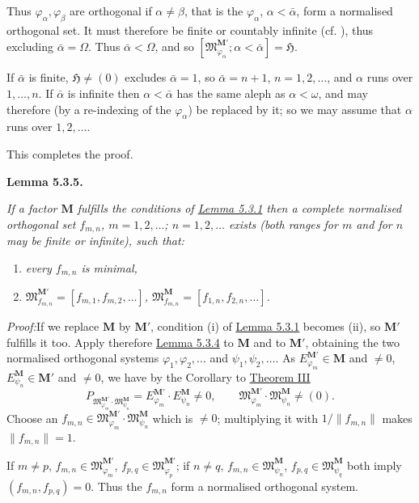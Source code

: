 \documentclass[12pt,b5paper,twoside]{article}
\newcommand{\Hspace}{\mathfrak H}
\newcommand{\M}{\mathbf M}
\newcommand{\Lemma}[1]{%
  \par\smallskip\noindent\phantomsection\label{lem:#1}\textbf{Lemma #1.}\enspace
}
\newcommand{\Proof}{\par\noindent\textit{Proof:}\enspace}
\newcommand{\lemref}[1]{\hyperref[lem:#1]{Lemma #1}}
\newcommand{\thmref}[1]{\hyperref[thm:#1]{Theorem #1}}
\begin{document}
Thus $\varphi_\alpha,\varphi_\beta$ are orthogonal if
$\alpha\neq\beta$, that is the $\varphi_\alpha$, $\alpha<\bar\alpha$, form a
normalised orthogonal set. It must therefore be finite or countably infinite
(cf. \cite[p.~66]{ref16}), thus excluding $\bar\alpha=\Omega$. Thus
$\bar\alpha<\Omega$, and so
$[\mathfrak M_{\varphi_\alpha}^{\M'};\alpha<\bar\alpha]=\Hspace$.

If $\bar\alpha$ is finite, $\Hspace\neq(0)$ excludes $\bar\alpha=1$, so
$\bar\alpha=n+1$, $n=1,2,\ldots$, and $\alpha$ runs over $1,\ldots,n$.
If $\bar\alpha$ is infinite then $\alpha<\bar\alpha$ has the same aleph as
$\alpha<\omega$, and may therefore (by a re-indexing of the $\varphi_\alpha$)
be replaced by it; so we may assume that $\alpha$ runs over $1,2,\ldots$.

This completes the proof.

\Lemma{5.3.5}
\emph{If a factor $\M$ fulfills the conditions of \lemref{5.3.1} then a
complete normalised orthogonal set $f_{m,n}$, $m=1,2,\ldots$;
$n=1,2,\ldots$ exists (both ranges for $m$ and for $n$ may be finite or
infinite), such that:}
\begin{enumerate}[label=(\roman*)]
\item \emph{every $f_{m,n}$ is minimal,}
\item \emph{$\mathfrak M_{f_{m,n}}^{\M'}=[f_{m,1},f_{m,2},\ldots]$,
  $\mathfrak M_{f_{m,n}}^{\M}=[f_{1,n},f_{2,n},\ldots]$.}
\end{enumerate}

\Proof If we replace $\M$ by $\M'$, condition (i) of \lemref{5.3.1} becomes
(ii), so $\M'$ fulfills it too. Apply therefore \lemref{5.3.4} to $\M$ and
to $\M'$, obtaining the two normalised orthogonal systems
$\varphi_1,\varphi_2,\ldots$ and $\psi_1,\psi_2,\ldots$. As
$E_{\varphi_m}^{\M'}\in\M$ and $\neq0$,
$E_{\psi_n}^{\M}\in\M'$ and $\neq0$, we have by the Corollary to
\thmref{III}
\[
 P_{\mathfrak M_{\varphi_m}^{\M'}\cdot
    \mathfrak M_{\psi_n}^{\M}}
 =E_{\varphi_m}^{\M'}\cdot E_{\psi_n}^{\M}\neq0,
 \qquad
 \mathfrak M_{\varphi_m}^{\M'}\cdot
 \mathfrak M_{\psi_n}^{\M}\neq(0).
\]
Choose an
$f_{m,n}\in\mathfrak M_{\varphi_m}^{\M'}\cdot
\mathfrak M_{\psi_n}^{\M}$ which is $\neq0$; multiplying it with
$1/\lVert f_{m,n}\rVert$ makes $\lVert f_{m,n}\rVert=1$.

If $m\neq p$, $f_{m,n}\in\mathfrak M_{\varphi_m}^{\M'}$,
$f_{p,q}\in\mathfrak M_{\varphi_p}^{\M'}$; if $n\neq q$,
$f_{m,n}\in\mathfrak M_{\psi_n}^{\M}$,
$f_{p,q}\in\mathfrak M_{\psi_q}^{\M}$ both imply
$(f_{m,n},f_{p,q})=0$. Thus the $f_{m,n}$ form a normalised orthogonal system.
\end{document}
